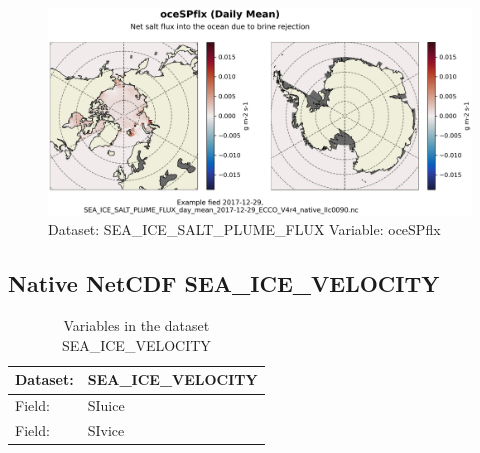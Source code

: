 \begin{figure}[H]
\centering
\includegraphics[scale=0.55]{../images/plots/native_plots/Sea-Ice_Salt_Plume_Fluxes/oceSPflx.png}
\caption{Dataset: SEA\_ICE\_SALT\_PLUME\_FLUX Variable: oceSPflx}
\label{tab:table-SEA_ICE_SALT_PLUME_FLUX_oceSPflx-Plot}
\end{figure}
\pagebreak
\subsection{Native NetCDF SEA\_ICE\_VELOCITY}
\newp
\begin{longtable}{|p{}|p{}|}
\caption{Variables in the dataset SEA\_ICE\_VELOCITY}
\label{tab:table-SEA_ICE_VELOCITY-fields} \\ 
\hline \endhead \hline \endfoot
\rowcolor{lightgray} \textbf{Dataset:} & \textbf{SEA\_ICE\_VELOCITY} \\ \hline
Field: &SIuice \\ \hline
Field: &SIvice \\ \hline
\end{longtable}

\pagebreak
